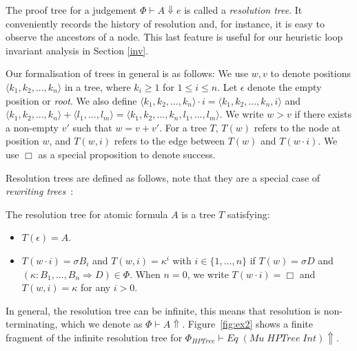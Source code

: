 \documentclass{llncs}
\newcommand{\Conid}[1]{\mathit{#1}}
\renewcommand{\leq}{\leqslant}
\renewcommand{\geq}{\geqslant}
\begin{document}
The proof tree for a judgement $\Phi \vdash A \Downarrow e$ is called a
\emph{resolution tree}.  It conveniently records the history of resolution and,
for instance, it is easy to observe the ancestors of a node. This last feature
is useful for our heuristic loop invariant analysis in Section \ref{inv}.    
 
Our formalisation of trees in general is as follows: We use $w, v$ to denote
positions $\langle k_1, k_2, ..., k_n \rangle$ in a tree, where $k_i \geq 1 $
for $ 1 \leq i \leq n $.  Let $\epsilon$ denote the empty position or
\emph{root}. We also define $\langle k_1, k_2, ..., k_n \rangle \cdot i =
\langle k_1, k_2, ..., k_n, i\rangle $ and $\langle k_1, k_2, ..., k_n \rangle
+ \langle l_1,..., l_m \rangle = \langle k_1, k_2, ..., k_n, l_1, ..., l_m
\rangle$. We write $w > v$ if there exists a non-empty $v'$ such that $w = v + v'$. For a tree $T$, $T(w)$ refers to the node at position $w$, and
$T(w, i)$ refers to the edge between $T(w)$ and $T(w\cdot i)$. We use $\Box$ as a special proposition to denote
success.   


 Resolution trees are defined as follows, note that they are a special case of \textit{rewriting
 trees}~\cite{KomendantskayaEtAl15,KJ15}: 
\begin{definition}
The resolution tree for atomic formula $A$ is
a tree $T$ satisfying:
\begin{itemize}
\item $T(\epsilon) =  A$.
\item $T(w \cdot i) = \sigma B_i$ and $T(w, i) = \kappa^i$ with $i \in \{1
,..., n\}$ if $T(w) = \sigma D$ and $(\kappa : B_1, ..., B_n \Rightarrow D) \in
\Phi$. When $n = 0$, we write $T(w \cdot i) = \Box$ and $T(w, i) = \kappa$ for
any $i > 0$.  
\end{itemize}
\end{definition}




In general, the resolution tree can be infinite, this means that resolution is
non-terminating, which we denote as $\Phi \vdash A \Uparrow$.
Figure~\ref{fig:ex2} shows a finite fragment of the infinite resolution tree for $\Phi_{\ensuremath{\Conid{HPTree}}} \vdash \ensuremath{\Conid{Eq}\;(\Conid{Mu}\;\Conid{HPTree}\;\Conid{Int})} \Uparrow$.
\end{document}
